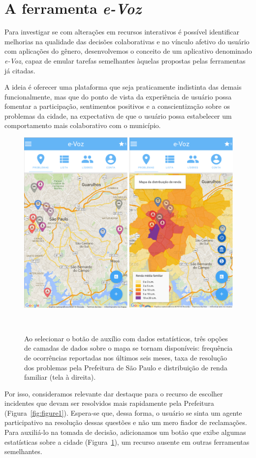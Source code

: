 \documentclass{sigchi}
\begin{document}
\section{A ferramenta \textit{e-Voz}}
Para investigar se com alterações em recursos interativos é possível identificar melhorias na qualidade das decisões colaborativas e no vínculo afetivo do usuário com aplicações do gênero, desenvolvemos o conceito de um aplicativo denominado \textit{e-Voz}, capaz de emular tarefas semelhantes àquelas propostas pelas ferramentas já citadas.

A ideia é oferecer uma plataforma que seja praticamente indistinta das demais funcionalmente, mas que do ponto de vista da experiência de usuário possa fomentar a participação, sentimentos positivos e a conscientização sobre os problemas da cidade, na expectativa de que o usuário possa estabelecer um comportamento mais colaborativo com o município.

\begin{figure}
	\centering
	\includegraphics[width=0.88\columnwidth]{figures/prototipo2b}
	\caption{Ao selecionar o botão de auxílio com dados estatísticos, três opções de camadas de dados sobre o mapa se tornam disponíveis: frequência de ocorrências reportadas nos últimos seis meses, taxa de resolução dos problemas pela Prefeitura de São Paulo e distribuição de renda familiar (tela à direita).  }~\label{fig:figure2}
\end{figure}

Por isso, consideramos relevante dar destaque para o recurso de escolher incidentes que devam ser resolvidos mais rapidamente pela Prefeitura (Figura~\ref{fig:figure1}). Espera-se que, dessa forma, o usuário se sinta um agente participativo na resolução dessas questões e não um mero fiador de reclamações. Para auxiliá-lo na tomada de decisão, adicionamos um botão que exibe algumas estatísticas sobre a cidade (Figura~\ref{fig:figure2}), um recurso ausente em outras ferramentas semelhantes.
\end{document}
